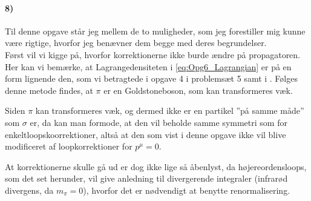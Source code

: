 \documentclass[../main.tex]{subfiles}
\begin{document}

\paragraph[8) Højereordens loopkorrektioner og $\pi$-propagatoren]{\textbf{8)}}

Til denne opgave står jeg mellem de to muligheder, som jeg forestiller mig kunne være rigtige, hvorfor jeg benævner dem begge med deres begrundelser.
\\

Først vil vi kigge på, hvorfor korrektionerne ikke burde ændre på propagatoren. Her kan vi bemærke, at Lagrangedensiteten i \cref{eq:Opg6_Lagrangian} er på en form lignende den, som vi betragtede i opgave 4 i problemsæt 5 \cite[opg. 4]{problemSet5} samt i \cite[kap. 10.8]{griffiths_IntroductionToElementaryParticles}. Følges denne metode findes, at $\pi$ er en Goldstoneboson, som kan transformeres væk.

Siden $\pi$ kan transformeres væk, og dermed ikke er en partikel ''på samme måde'' som $\sigma$ er, da kan man formode, at den vil beholde samme symmetri som for enkeltloopskoorrektioner, altså at den som vist i denne opgave ikke vil blive modificeret af loopkorrektioner for $p^\mu = 0$.


At korrektionerne skulle gå ud er dog ikke lige så åbenlyst, da højereordensloops, som det set herunder, vil give anledning til divergerende integraler (infrarød divergens, da $m_\pi = 0$), hvorfor det er nødvendigt at benytte renormalisering.

\begin{center}
\end{center}
$ $\\
\end{document}
